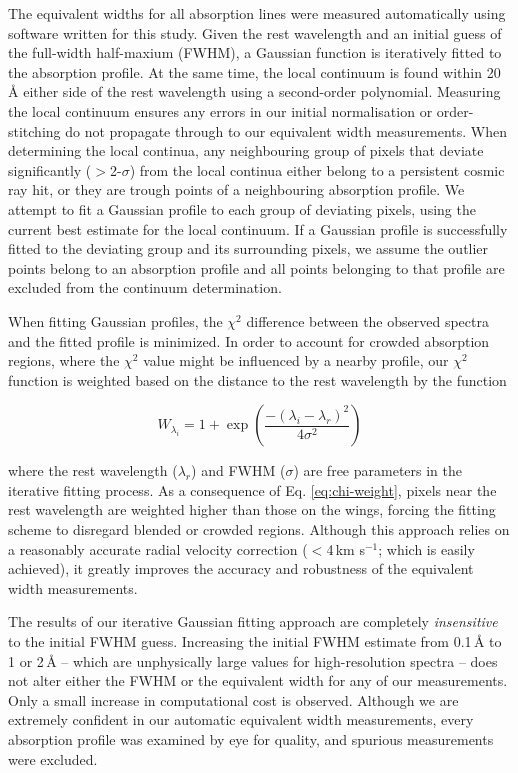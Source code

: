 \documentclass{emulateapj}
\begin{document}
The equivalent widths for all absorption lines were measured automatically using software written for this study. Given the rest wavelength and an initial guess of the full-width half-maxium (FWHM), a Gaussian function is iteratively fitted to the absorption profile. At the same time, the local continuum is found within 20\,\AA{} either side of the rest wavelength using a second-order polynomial. Measuring the local continuum ensures any errors in our initial normalisation or order-stitching do not propagate through to our equivalent width measurements. When determining the local continua, any neighbouring group of pixels that deviate significantly ($>$2-$\sigma$) from the local continua either belong to a persistent cosmic ray hit, or they are trough points of a neighbouring absorption profile. We attempt to fit a Gaussian profile to each group of deviating pixels, using the current best estimate for the local continuum. If a Gaussian profile is successfully fitted to the deviating group and its surrounding pixels, we assume the outlier points belong to an absorption profile and all points belonging to that profile are excluded from the continuum determination. 

When fitting Gaussian profiles, the $\chi^2$ difference between the observed spectra and the fitted profile is minimized. In order to account for crowded absorption regions, where the $\chi^2$ value might be influenced by a nearby profile, our $\chi^2$ function is weighted based on the distance to the rest wavelength by the function

\begin{equation}
W_{\lambda_{i}} = 1 + \exp{\left(\frac{-(\lambda_{i} - \lambda_{r})^2}{4\sigma^2}\right)}
\label{eq:chi-weight}
\end{equation}

\noindent where the rest wavelength ($\lambda_{r}$) and FWHM ($\sigma$) are free parameters in the iterative fitting process. As a consequence of Eq. \ref{eq:chi-weight}, pixels near the rest wavelength are weighted higher than those on the wings, forcing the fitting scheme to disregard blended or crowded regions. Although this approach relies on a reasonably accurate radial velocity correction ($<$4\,km s$^{-1}$; which is easily achieved), it greatly improves the accuracy and robustness of the equivalent width measurements.

The results of our iterative Gaussian fitting approach are completely \textit{insensitive} to the initial FWHM guess. Increasing the initial FWHM estimate from 0.1\,\AA{} to 1 or 2\,\AA{} -- which are unphysically large values for high-resolution spectra -- does not alter either the FWHM or the equivalent width for any of our measurements. Only a small increase in computational cost is observed. Although we are extremely confident in our automatic equivalent width measurements, every absorption profile was examined by eye for quality, and spurious measurements were excluded.
\end{document}
